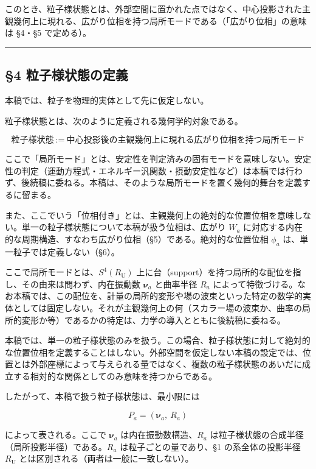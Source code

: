 \documentclass[
]{ltjsarticle}
\begin{document}
このとき、粒子様状態とは、外部空間に置かれた点ではなく、中心投影された主観幾何上に現れる、広がり位相を持つ局所モードである（「広がり位相」の意味は
§4・§5 で定める）。

\begin{center}\rule{0.5\linewidth}{0.5pt}\end{center}

\subsection{§4
粒子様状態の定義}\label{ux7c92ux5b50ux69d8ux72b6ux614bux306eux5b9aux7fa9}

本稿では、粒子を物理的実体として先に仮定しない。

粒子様状態とは、次のように定義される幾何学的対象である。

\[\text{粒子様状態}\ :=\ \text{中心投影後の主観幾何上に現れる広がり位相を持つ局所モード}\]

ここで「局所モード」とは、安定性を判定済みの固有モードを意味しない。安定性の判定（運動方程式・エネルギー汎関数・摂動安定性など）は本稿では行わず、後続稿に委ねる。本稿は、そのような局所モードを置く幾何的舞台を定義するに留まる。

また、ここでいう「位相付き」とは、主観幾何上の絶対的な位置位相を意味しない。単一の粒子様状態について本稿が扱う位相は、広がり
\(W_a\)
に対応する内在的な周期構造、すなわち広がり位相（§5）である。絶対的な位置位相
\(\phi_a\) は、単一粒子では定義しない（§6）。

ここで局所モードとは、\(S^4(R_{\mathrm U})\)
上に台（support）を持つ局所的な配位を指し、その由来は問わず、内在振動数
\(\boldsymbol{\nu}_a\) と曲率半径 \(R_a\)
によって特徴づける。なお本稿では、この配位を、計量の局所的変形や場の波束といった特定の数学的実体としては固定しない。それが主観幾何上の何（スカラー場の波束か、曲率の局所的変形か等）であるかの特定は、力学の導入とともに後続稿に委ねる。

本稿では、単一の粒子様状態のみを扱う。この場合、粒子様状態に対して絶対的な位置位相を定義することはしない。外部空間を仮定しない本稿の設定では、位置とは外部座標によって与えられる量ではなく、複数の粒子様状態のあいだに成立する相対的な関係としてのみ意味を持つからである。

したがって、本稿で扱う粒子様状態は、最小限には

\[P_a=(\boldsymbol{\nu}_a,\ R_a)\]

によって表される。ここで \(\boldsymbol{\nu}_a\)
は内在振動数構造、\(R_a\)
は粒子様状態の合成半径（局所投影半径）である。\(R_a\)
は粒子ごとの量であり、§1 の系全体の投影半径 \(R_{\mathrm U}\)
とは区別される（両者は一般に一致しない）。
\end{document}
